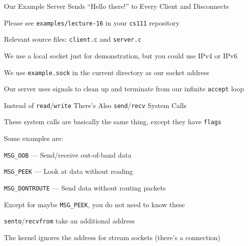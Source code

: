   \begin{frame}{Our Example Server Sends ``Hello there!'' to Every Client and
                Disconnects}

    Please see \texttt{examples/lecture-16} in your \texttt{cs111} repository

    \hspace{2em} Relevant source files: \texttt{client.c} and \texttt{server.c}

    \vspace{2em}

    We use a local socket just for demonstration, but you could use IPv4 or IPv6

    \hspace{2em} We use \texttt{example.sock} in the current directory as our
                 socket address

    \vspace{2em}

    Our server uses signals to clean up and terminate from our infinite
    \texttt{accept} loop
  \end{frame}

  \begin{frame}{Instead of \texttt{read}/\texttt{write} There's Also
                \texttt{send}/\texttt{recv} System Calls}

    These system calls are basically the same thing, except they have
    \texttt{flags}

    \vspace{2em}

    Some examples are:

    \hspace{2em} \texttt{MSG\_OOB} --- Send/receive out-of-band data

    \hspace{2em} \texttt{MSG\_PEEK} --- Look at data without reading

    \hspace{2em} \texttt{MSG\_DONTROUTE} --- Send data without routing packets

    \vspace{2em}

    Except for maybe \texttt{MSG\_PEEK}, you do not need to know these

    \vspace{2em}

    \texttt{sento}/\texttt{recvfrom} take an additional address

    \hspace{2em} The kernel ignores the address for stream sockets (there's a
                 connection)
  \end{frame}

